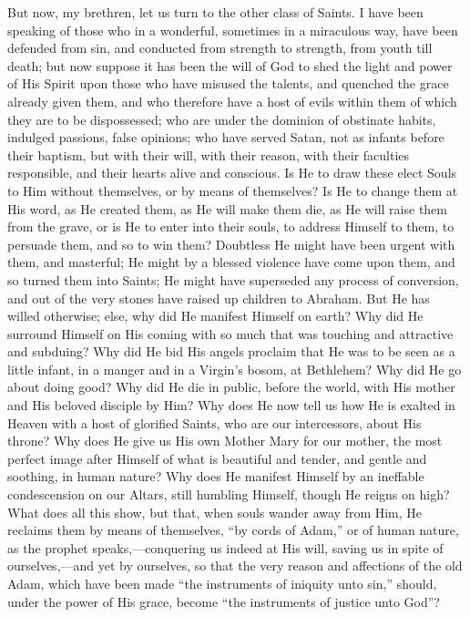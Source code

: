 But now, my brethren, let us turn to the other class of Saints. I
have been speaking of those who in a wonderful, sometimes in a
miraculous way, have been defended from sin, and conducted from
strength to strength, from youth till death; but now suppose it has
been the will of God to shed the light and power of His Spirit upon
those who have misused the talents, and quenched the grace already
given them, and who therefore have a host of evils within them of
which they are to be dispossessed; who are under the dominion of
obstinate habits, indulged passions, false opinions; who have served
Satan, not as infants before their baptism, but with their will, with
their reason, with their faculties responsible, and their hearts alive
and conscious. Is He to draw these elect Souls to Him without
themselves, or by means of themselves? Is He to change them at His
word, as He created them, as He will make them die, as He will raise
them from the grave, or is He to enter into their souls, to address
Himself to them, to persuade them, and so to win them? Doubtless He
might have been urgent with them, and masterful; He might by a blessed
violence have come upon them, and so turned them into Saints; He might
have superseded any process of conversion, and out of the very stones
have raised up children to Abraham. But He has willed otherwise; else,
why did He manifest Himself on earth? Why did He surround Himself on
His coming with so much that was touching and attractive and subduing?
Why did He bid His angels proclaim that He was to be seen as a little
infant, in a manger and in a Virgin's bosom, at Bethlehem? Why did He
go about doing good? Why did He die in public, before the world, with
His mother and His beloved disciple by Him? Why does He now tell us
how He is exalted in Heaven with a host of glorified Saints, who are
our intercessors, about His throne? Why does He give us His own Mother
Mary for our mother, the most perfect image after Himself of what is
beautiful and tender, and gentle and soothing, in human nature? Why
does He manifest Himself by an ineffable condescension on our Altars,
still humbling Himself, though He reigns on high? What does all this
show, but that, when souls wander away from Him, He reclaims them by
means of themselves, ``by cords of Adam,'' or of human nature,
as the prophet speaks,—conquering us indeed at His will, saving us
in spite of ourselves,—and yet by ourselves, so that the very reason
and affections of the old Adam, which have been made ``the
instruments of iniquity unto sin,'' should, under the power of His
grace, become ``the instruments of justice unto God''?

